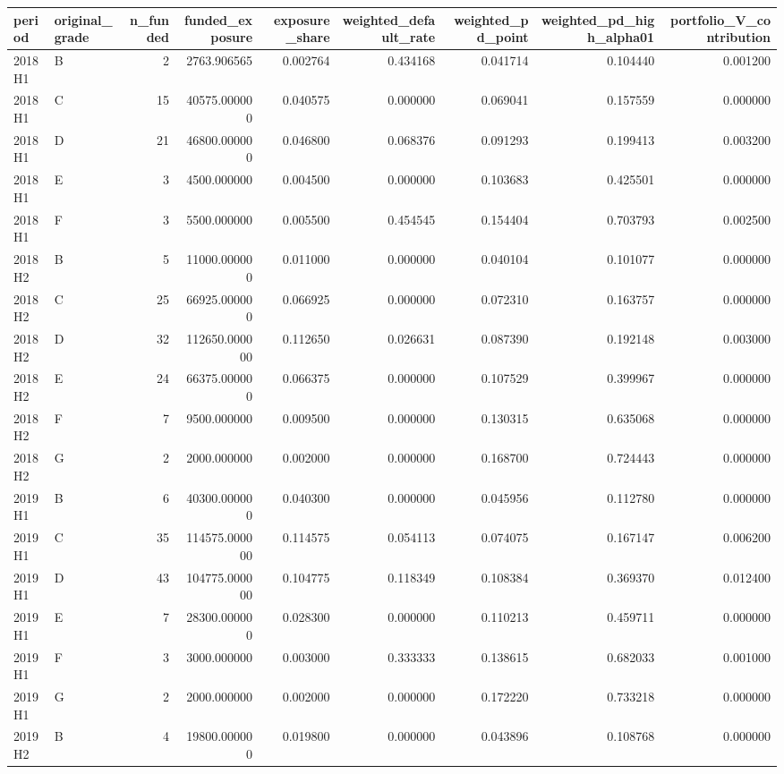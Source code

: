 \begin{tabular}{llrrrrrrr}
\toprule
period & original\_grade & n\_funded & funded\_exposure & exposure\_share & weighted\_default\_rate & weighted\_pd\_point & weighted\_pd\_high\_alpha01 & portfolio\_V\_contribution \\
\midrule
2018H1 & B & 2 & 2763.906565 & 0.002764 & 0.434168 & 0.041714 & 0.104440 & 0.001200 \\
2018H1 & C & 15 & 40575.000000 & 0.040575 & 0.000000 & 0.069041 & 0.157559 & 0.000000 \\
2018H1 & D & 21 & 46800.000000 & 0.046800 & 0.068376 & 0.091293 & 0.199413 & 0.003200 \\
2018H1 & E & 3 & 4500.000000 & 0.004500 & 0.000000 & 0.103683 & 0.425501 & 0.000000 \\
2018H1 & F & 3 & 5500.000000 & 0.005500 & 0.454545 & 0.154404 & 0.703793 & 0.002500 \\
2018H2 & B & 5 & 11000.000000 & 0.011000 & 0.000000 & 0.040104 & 0.101077 & 0.000000 \\
2018H2 & C & 25 & 66925.000000 & 0.066925 & 0.000000 & 0.072310 & 0.163757 & 0.000000 \\
2018H2 & D & 32 & 112650.000000 & 0.112650 & 0.026631 & 0.087390 & 0.192148 & 0.003000 \\
2018H2 & E & 24 & 66375.000000 & 0.066375 & 0.000000 & 0.107529 & 0.399967 & 0.000000 \\
2018H2 & F & 7 & 9500.000000 & 0.009500 & 0.000000 & 0.130315 & 0.635068 & 0.000000 \\
2018H2 & G & 2 & 2000.000000 & 0.002000 & 0.000000 & 0.168700 & 0.724443 & 0.000000 \\
2019H1 & B & 6 & 40300.000000 & 0.040300 & 0.000000 & 0.045956 & 0.112780 & 0.000000 \\
2019H1 & C & 35 & 114575.000000 & 0.114575 & 0.054113 & 0.074075 & 0.167147 & 0.006200 \\
2019H1 & D & 43 & 104775.000000 & 0.104775 & 0.118349 & 0.108384 & 0.369370 & 0.012400 \\
2019H1 & E & 7 & 28300.000000 & 0.028300 & 0.000000 & 0.110213 & 0.459711 & 0.000000 \\
2019H1 & F & 3 & 3000.000000 & 0.003000 & 0.333333 & 0.138615 & 0.682033 & 0.001000 \\
2019H1 & G & 2 & 2000.000000 & 0.002000 & 0.000000 & 0.172220 & 0.733218 & 0.000000 \\
2019H2 & B & 4 & 19800.000000 & 0.019800 & 0.000000 & 0.043896 & 0.108768 & 0.000000 \\

\end{tabular}
